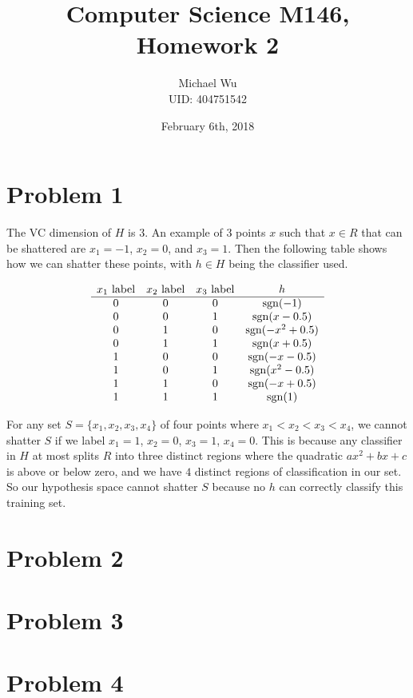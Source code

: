 \documentclass[12pt]{article}
\begin{document}
\title{Computer Science M146, Homework 2}
\date{February 6th, 2018}
\author{Michael Wu\\UID: 404751542}
\maketitle

\section*{Problem 1}

The VC dimension of \(H\) is \(3\). An example of \(3\) points \(x\) such that \(x\in R\) that can be shattered are \(x_1=-1\),
\(x_2=0\), and \(x_3=1\). Then the following table shows how we can shatter these points, with \(h\in H\) being the classifier used.

\[
        \begin{array}{c c c c}
                x_1 \text{ label}& x_2 \text{ label}& x_3 \text{ label} & h\\
                \hline
                0 & 0 & 0 & \operatorname{sgn}(-1)\\
                0 & 0 & 1 & \operatorname{sgn}(x-0.5)\\
                0 & 1 & 0 & \operatorname{sgn}(-x^2+0.5)\\
                0 & 1 & 1 & \operatorname{sgn}(x+0.5)\\
                1 & 0 & 0 & \operatorname{sgn}(-x-0.5)\\
                1 & 0 & 1 & \operatorname{sgn}(x^2-0.5)\\
                1 & 1 & 0 & \operatorname{sgn}(-x+0.5)\\
                1 & 1 & 1 & \operatorname{sgn}(1)\\
        \end{array}
\]

For any set \(S=\{x_1,x_2,x_3,x_4\}\) of four points where \(x_1<x_2<x_3<x_4\), we cannot shatter \(S\) if we label \(x_1=1\), \(x_2=0\),
\(x_3=1\), \(x_4=0\). This is because any classifier in \(H\) at most splits \(R\) into three distinct regions where the quadratic
\(ax^2+bx+c\) is above or below zero, and we have \(4\) distinct regions of classification in our set. So our hypothesis space cannot
shatter \(S\) because no \(h\) can correctly classify this training set.

\section*{Problem 2}

\section*{Problem 3}

\section*{Problem 4}
\end{document}
